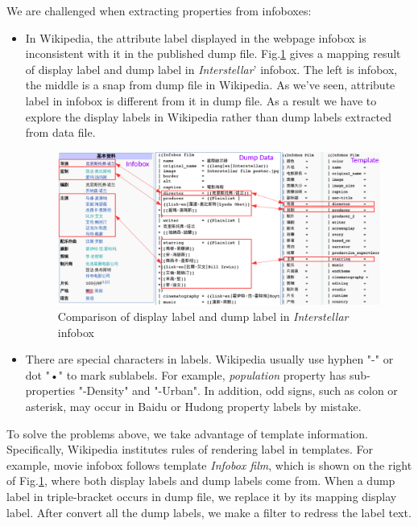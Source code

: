 \documentclass[runningheads,a4paper]{llncs}
\begin{document}
We are challenged when extracting properties from infoboxes:
\begin{itemize}
    \item In Wikipedia, the attribute label displayed in the webpage infobox is inconsistent with it in the published dump file. Fig.\ref{fig:infobox-template} gives a mapping result of display label and dump label in \emph{Interstellar}' infobox. The left is infobox, the middle is a snap from dump file in Wikipedia. As we've seen, attribute label in infobox is different from it in dump file. As a result we have to explore the display labels in Wikipedia rather than dump labels extracted from data file. 
    \begin{figure}[ht]
        \centerline{\includegraphics[width=1\columnwidth]{fig/infobox-template}}
        \caption{Comparison of display label and dump label in \emph{Interstellar} infobox}
        \label{fig:infobox-template}
    \end{figure}%
\item There are special characters in labels. Wikipedia usually use hyphen "-" or dot "•" to mark sublabels. For example, \emph{population} property has sub-properties "-Density" and "-Urban". In addition, odd signs, such as colon or asterisk, may occur in Baidu or Hudong property labels by mistake.
\end{itemize}

To solve the problems above, we take advantage of template information. Specifically, Wikipedia institutes rules of rendering label in templates. For example, movie infobox follows template \emph{Infobox film}, which is shown on the right of Fig.\ref{fig:infobox-template}, where both display labels and dump labels come from. When a dump label in triple-bracket occurs in dump file, we replace it by its mapping display label. After convert all the dump labels, we make a filter to redress the label text.
\end{document}
